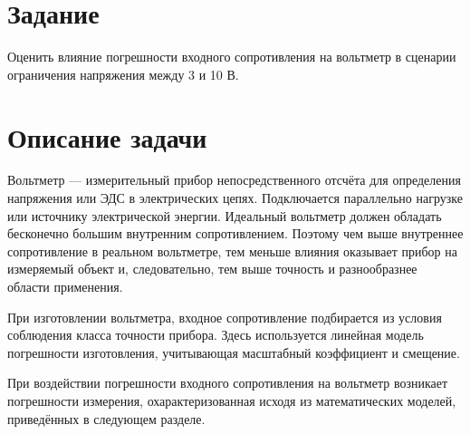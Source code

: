 \documentclass[12pt]{article}   %
\begin{document}
\clearpage

\renewcommand{\baselinestretch}{1.2}
\tableofcontents
\renewcommand{\baselinestretch}{1.5}





\section{Задание}

Оценить влияние погрешности входного сопротивления на вольтметр в сценарии ограничения напряжения между 3 и 10 В.

\section{Описание задачи}

Вольтметр — измерительный прибор непосредственного отсчёта для определения напряжения или ЭДС в электрических цепях. Подключается параллельно нагрузке или источнику электрической энергии. Идеальный вольтметр должен обладать бесконечно большим внутренним сопротивлением. Поэтому чем выше внутреннее сопротивление в реальном вольтметре, тем меньше влияния оказывает прибор на измеряемый объект и, следовательно, тем выше точность и разнообразнее области применения.

При изготовлении вольтметра, входное сопротивление подбирается из условия соблюдения класса точности прибора. Здесь используется линейная модель погрешности изготовления, учитывающая масштабный коэффициент и смещение.

При воздействии погрешности входного сопротивления на вольтметр возникает погрешности измерения, охарактеризованная исходя из математических моделей, приведённых в следующем разделе.
\end{document}
